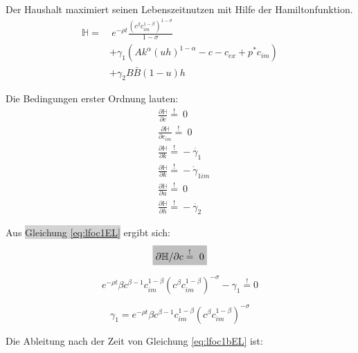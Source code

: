 Der Haushalt maximiert seinen Lebenszeitnutzen mit Hilfe der Hamiltonfunktion.\\


	\begin{equation}
		\begin{split}\mathbb{H}=&~e^{-\rho t}\frac{(c^\beta c_{im}^{1-\beta})^{1-\sigma}}{1-\sigma}\\
		&+\gamma_1(Ak^\alpha(uh)^{1-\alpha}-c-c_{ex}+p^*c_{im})\\
		&+\gamma_2B\bar{B}(1-u)h\end{split}
	\end{equation}


Die Bedingungen erster Ordnung lauten:\\


	\begin{align}
		&\frac{\partial\mathbb{H}}{\partial c}\overset{!}{=}~0\label{eq:lfoc1EL}\\
		&\frac{\partial\mathbb{H}}{\partial c_{im}}\overset{!}{=}~0\label{eq:lfoc1imEL}\\
		&\frac{\partial\mathbb{H}}{\partial k}\overset{!}{=}-\dot{\gamma_1}\label{eq:lfoc3EL}\\
		&\frac{\partial\mathbb{H}}{\partial k}\overset{!}{=}-\dot{\gamma}_{1im}\label{eq:lfoc3imEL}\\
		&\frac{\partial\mathbb{H}}{\partial u}\overset{!}{=}~0\label{eq:lfoc4EL}\\
		&\frac{\partial\mathbb{H}}{\partial h}\overset{!}{=}-\dot{\gamma_2}\label{eq:lfoc5EL}
	\end{align}


Aus \colorbox{lightgray}{Gleichung \eqref{eq:lfoc1EL}} ergibt sich:\\


	\begin{equation*}
		\colorbox{lightgray}{$\partial\mathbb{H}/\partial c\overset{!}{=}~0$}
	\end{equation*}


	\begin{equation}
		e^{-\rho t}\beta c^{\beta-1}c_{im}^{1-\beta}(c^\beta c_{im}^{1-\beta})^{-\sigma}-\gamma_1\overset{!}{=}0\label{eq:lfoc1aEL}
	\end{equation}


	\begin{equation}
		\gamma_1=e^{-\rho t}\beta c^{\beta-1}c_{im}^{1-\beta}(c^\beta c_{im}^{1-\beta})^{-\sigma}\label{eq:lfoc1bEL}
	\end{equation}


Die Ableitung nach der Zeit von Gleichung \eqref{eq:lfoc1bEL} ist:


